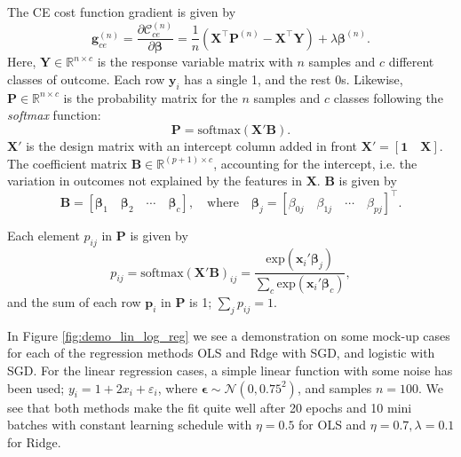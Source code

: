 \documentclass[]{article}
\begin{document}
The CE cost function gradient is given by
\begin{equation} \label{cost-mse}
	\mathbf{g}_{ce}^{(n)} = \frac{\partial \mathcal{C}_{ce}^{(n)}}{\partial \mathbf{\beta}} = \frac{1}{n} (\mathbf{X}^\intercal \mathbf{P}^{(n)} - \mathbf{X}^\intercal \mathbf{Y}) + \lambda \mathbf{\beta}^{(n)}.
\end{equation}
Here, $\mathbf{Y} \in \mathbb{R}^{n \times c}$ is the response variable matrix with $n$ samples and $c$ different classes of outcome. Each row $\mathbf{y}_i$ has a single 1, and the rest 0s. Likewise, $\mathbf{P} \in \mathbb{R}^{n \times c}$ is the probability matrix for the $n$ samples and $c$ classes following the \textit{softmax} function:
\begin{equation}
	\mathbf{P} = \mathrm{softmax}(\mathbf{X}'\mathbf{B}).
\end{equation}
$\mathbf{X}'$ is the design matrix with an intercept column added in front $\mathbf{X}' = [\mathbf{1} \quad \mathbf{X}]$. The coefficient matrix $\mathbf{B} \in \mathbb{R}^{(p+1) \times c}$, accounting for the intercept, i.e. the variation in outcomes not explained by the features in $\mathbf{X}$. $\mathbf{B}$ is given by
\begin{equation}
	\mathbf{B} = [\mathbf{\beta}_1 \quad \mathbf{\beta}_2 \quad \cdots \quad \mathbf{\beta}_c], \quad \text{where} \quad \mathbf{\beta}_j = [\beta_{0j} \quad \beta_{1j} \quad \cdots \quad \beta_{pj}]^\intercal.
\end{equation}

Each element $p_{ij}$ in $\mathbf{P}$ is given by
\begin{equation} \label{log-reg-pij}
	p_{ij} = \mathrm{softmax}(\mathbf{X}'\mathbf{B})_{ij} = \frac{\mathrm{exp}(\mathbf{x}_i'\mathbf{\beta}_j)} {\sum_{c}\mathrm{exp}(\mathbf{x}_i'\mathbf{\beta}_c)},
\end{equation}
and the sum of each row $\mathbf{p}_i$ in $\mathbf{P}$ is 1; $\sum_{j} p_{ij} = 1$.

In Figure \ref{fig:demo_lin_log_reg} we see a demonstration on some mock-up cases for each of the regression methods OLS and Rdge with SGD, and logistic with SGD. For the linear regression cases, a simple linear function with some noise has been used; $y_i = 1 + 2x_i + \varepsilon_i$, where $\mathbf{\epsilon} \sim \mathcal{N}(0, 0.75^2)$, and samples $n=100$. We see that both methods make the fit quite well after 20 epochs and 10 mini batches with constant learning schedule with $\eta = 0.5$ for OLS and $\eta = 0.7, \lambda=0.1$ for Ridge.
\end{document}
